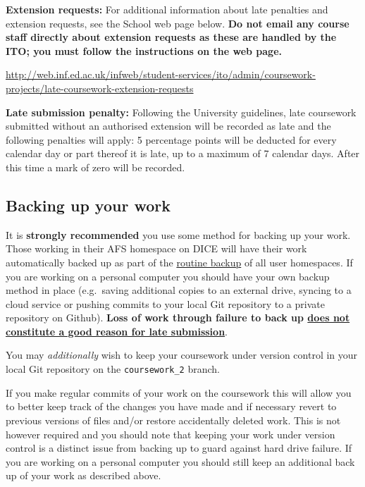 \documentclass[11pt,]{article}
\begin{document}
\textbf{Extension requests:} 
For additional information about late penalties and extension
requests, see the School web page below. \textbf{Do  not email any course
staff directly about extension requests as these are handled by the ITO; 
you must follow the instructions on the web page.}

{\small \url{http://web.inf.ed.ac.uk/infweb/student-services/ito/admin/coursework-projects/late-coursework-extension-requests}}

\textbf{Late submission penalty:}  
Following the University guidelines, 
late coursework submitted without an authorised extension will be
recorded as late and the following penalties will apply: 5
percentage points will be deducted for every calendar day or part
thereof it is late, up to a maximum of 7 calendar days. After this
time a mark of zero will be recorded.

\subsection{Backing up your work}
\label{sec:backing-up-your-work}

It is \textbf{strongly recommended} you use some method for backing up
your work. Those working in their AFS homespace on DICE will have their
work automatically backed up as part of the
\href{http://computing.help.inf.ed.ac.uk/backups-and-mirrors}{routine
backup} of all user homespaces. If you are working on a personal
computer you should have your own backup method in place (e.g.~saving
additional copies to an external drive, syncing to a cloud service or
pushing commits to your local Git repository to a private repository on
Github). \textbf{Loss of work through failure to back up
\href{http://web.inf.ed.ac.uk/infweb/student-services/ito/admin/coursework-projects/late-coursework-extension-requests}{does not constitute a good reason for
late submission}}.

You may \emph{additionally} wish to keep your coursework under version
control in your local Git repository on the \verb+coursework_2+ branch.

If you make regular commits of your work on the coursework this will
allow you to better keep track of the changes you have made and if
necessary revert to previous versions of files and/or restore
accidentally deleted work. This is not however required and you should
note that keeping your work under version control is a distinct issue
from backing up to guard against hard drive failure. If you are working
on a personal computer you should still keep an additional back up of
your work as described above.
\end{document}
